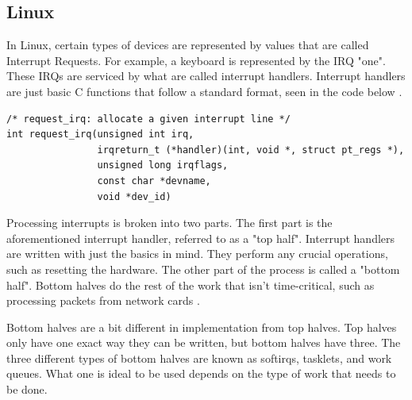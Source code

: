 \documentclass[10pt,draftclsnofoot,onecolumn,journal,compsoc]{IEEEtran}
\begin{document}
\subsection{Linux}
 In Linux, certain types of devices are represented by values that are called Interrupt Requests. For example, a keyboard is represented by the IRQ "one". These IRQs are serviced by what are called interrupt handlers. Interrupt handlers are just basic C functions that follow a standard format, seen in the code below \cite{linux_proc}.
 
\begin{lstlisting}[caption={The \textit{request\_irq} prototype in the linux/interrupt.h file. Note that the \textit{handler} parameter is a function pointer to the interrupt handler.}]
/* request_irq: allocate a given interrupt line */
int request_irq(unsigned int irq,
                irqreturn_t (*handler)(int, void *, struct pt_regs *),
                unsigned long irqflags,
                const char *devname,
                void *dev_id)
\end{lstlisting}
Processing interrupts is broken into two parts. The first part is the aforementioned interrupt handler, referred to as a "top half". Interrupt handlers are written with just the basics in mind. They perform any crucial operations, such as resetting the hardware. The other part of the process is called a "bottom half". Bottom halves do the rest of the work that isn't time-critical, such as processing packets from network cards \cite{linux_proc}. 

Bottom halves are a bit different in implementation from top halves. Top halves only have one exact way they can be written, but bottom halves have three. The three different types of bottom halves are known as softirqs, tasklets, and work queues. What one is ideal to be used depends on the type of work that needs to be done. 
\end{document}
